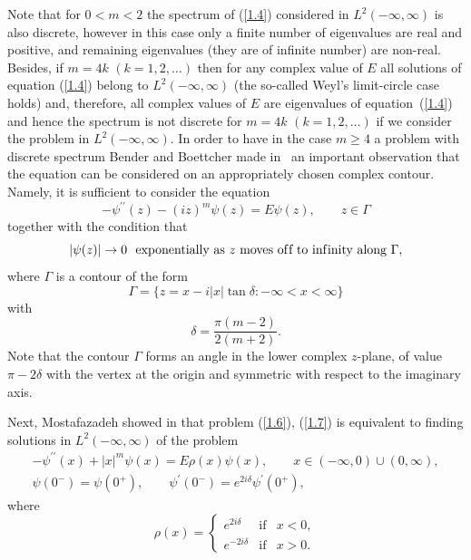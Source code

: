 Note that for $0<m<2$ the spectrum of (\ref{1.4}) considered in $%
L^{2}(-\infty ,\infty )$ is also discrete, however in this case only a
f\/inite number of eigenvalues are real and positive, and remaining
eigenvalues (they are of inf\/inite number) are non-real. Besides, if $m=4k$ $%
(k=1,2,\ldots )$ then for any complex value of $E$ all solutions of equation
(\ref{1.4}) belong to $L^{2}(-\infty ,\infty )$ (the so-called Weyl's
limit-circle case holds) and, therefore, all complex values of $E$ are
eigenvalues of equation~(\ref{1.4}) and hence the spectrum is not discrete
for $m=4k$ $(k=1,2,\ldots )$ if we consider the problem in $L^{2}(-\infty
,\infty ).$ In order to have in the case $m\geq 4$ a problem with discrete
spectrum Bender and Boettcher made in~\cite{[2]} an important observation
that the equation can be considered on an appropriately chosen complex
contour. Namely, it is suf\/f\/icient to consider the equation%
\begin{equation}
-\psi ^{\prime \prime }(z)-(iz)^{m}\psi (z)=E\psi (z),\qquad z\in \Gamma
\label{1.6}
\end{equation}%
together with the condition that%
\begin{equation}
\left\vert \psi (z)\right\vert \rightarrow 0 \ \text{ exponentially as }z\text{
moves of\/f to inf\/inity along }\Gamma ,  \label{1.7}
\end{equation}%
where $\Gamma $ is a contour of the form%
\[
\Gamma =\{z=x-i\left\vert x\right\vert \tan \delta :-\infty <x<\infty \}
\]%
with%
\[
\delta =\frac{\pi (m-2)}{2(m+2)}.
\]%
Note that the contour $\Gamma $ forms an angle in the lower complex $z$-plane, of value $\pi -2\delta $ with the vertex at the origin and symmetric
with respect to the imaginary axis.

Next, Mostafazadeh showed in \cite{[5]} that problem (\ref{1.6}), (\ref{1.7}) is equivalent to f\/inding solutions in $L^{2}(-\infty ,\infty )$ of the
problem%
\begin{gather}
-\psi ^{\prime \prime }(x)+\left\vert x\right\vert ^{m}\psi (x)=E\rho
(x)\psi (x),\qquad x\in (-\infty ,0)\cup (0,\infty ),  \label{1.8}
\\
\psi (0^{-})=\psi (0^{+}),\qquad \psi ^{\prime }(0^{-})=e^{2i\delta
}\psi ^{\prime }(0^{+}),  \label{1.9}
\end{gather}%
where%
\begin{equation}
\rho (x)=\left\{
\begin{array}{lll}
e^{2i\delta } & \text{if} & x<0, \\
e^{-2i\delta } & \text{if} & x>0.%
\end{array}%
\right.  \label{1.10}
\end{equation}

